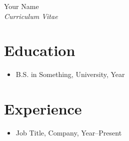 \documentclass[11pt]{article}
\begin{document}
\begin{center}
{\LARGE Your Name}\\[0.2cm]
\textit{Curriculum Vitae}
\end{center}

\section*{Education}
\begin{itemize}
  \item B.S. in Something, University, Year
\end{itemize}

\section*{Experience}
\begin{itemize}
  \item Job Title, Company, Year--Present
\end{itemize}
\end{document}
